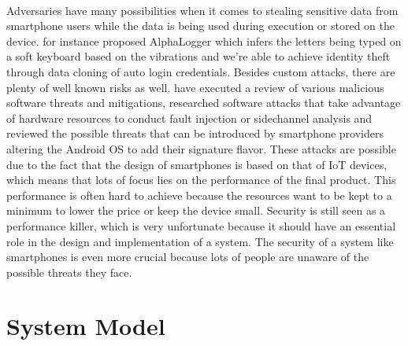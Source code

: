\documentclass{report}
\begin{document}
\paragraph*{}
Adversaries have many possibilities when it comes to stealing sensitive data from smartphone users while the data is being used during execution or stored on the device. \cite{JavedAbdulRehman2020Adms} for instance proposed AlphaLogger which infers the letters being typed on a soft keyboard based on the vibrations and \cite{SongWenna2020ADAv} we're able to achieve identity theft through data cloning of auto login credentials. Besides custom attacks, there are plenty of well known risks as well. \cite{SetyawanRico2020Abro} have executed a review of various malicious software threats and mitigations, \cite{GRAVELLIERJoseph2021RHAo} researched software attacks that take advantage of hardware resources to conduct fault injection or sidechannel analysis and \cite{KumarSudesh2020AoAS} reviewed the possible threats that can be introduced by smartphone providers altering the Android OS to add their signature flavor. These attacks are possible due to the fact that the design of smartphones is based on that of IoT devices, which means that lots of focus lies on the performance of the final product. This performance is often hard to achieve because the resources want to be kept to a minimum to lower the price or keep the device small. Security is still seen as a performance killer, which is very unfortunate because it should have an essential role in the design and implementation of a system. The security of a system like smartphones is even more crucial because lots of people are unaware of the possible threats they face.

\section{System Model}
\end{document}
